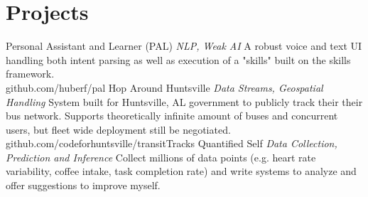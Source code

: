 \documentclass[letterpaper]{moderncv}        %
\begin{document}
\section{Projects}
\cventry
{}
{Personal Assistant and Learner (PAL)}
{}
{\textit{NLP, Weak AI}}
{}
{A robust voice and text UI handling both intent parsing as well as execution of a "skills" built on the skills framework.\\github.com/huberf/pal}
\cventry
{}
{Hop Around Huntsville}
{}
{\textit{Data Streams, Geospatial Handling}}
{}
{System built for Huntsville, AL government to publicly track their their bus network. Supports theoretically infinite amount of buses and concurrent users, but fleet wide deployment still be negotiated.\\github.com/codeforhuntsville/transitTracks}
\cventry
{}
{Quantified Self}
{}
{\textit{Data Collection, Prediction and Inference}}
{}
{Collect millions of data points (e.g. heart rate variability, coffee intake, task
completion rate) and write systems to analyze and offer suggestions to improve myself.}
    
\ 
\end{document}
